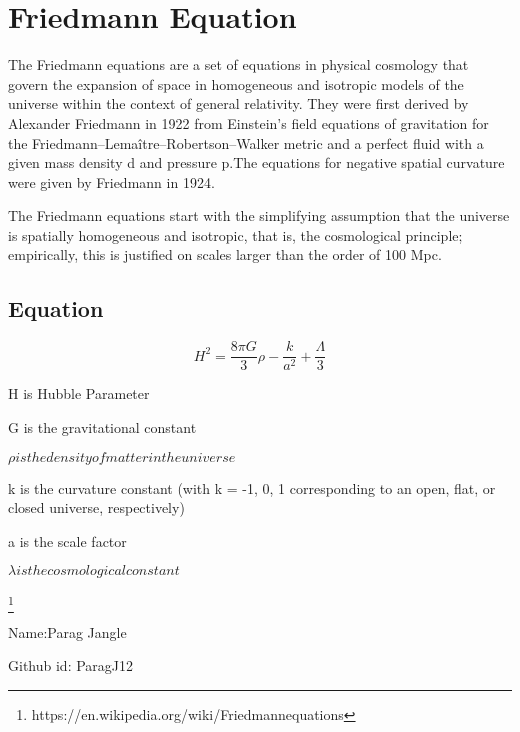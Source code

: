 \section{Friedmann Equation}
     The Friedmann equations are a set of equations in physical cosmology that govern the expansion of space in homogeneous and isotropic models of the universe within the context of general relativity. They were first derived by Alexander Friedmann in 1922 from Einstein's field equations of gravitation for the Friedmann–Lemaître–Robertson–Walker metric and a perfect fluid with a given mass density d and pressure p.The equations for negative spatial curvature were given by Friedmann in 1924.
     
     The Friedmann equations start with the simplifying assumption that the universe is spatially homogeneous and isotropic, that is, the cosmological principle; empirically, this is justified on scales larger than the order of 100 Mpc.
\subsection{Equation}

\begin{equation}
    H^2 = \frac{8\pi G}{3} \rho - \frac{k}{a^2} + \frac{\Lambda}{3}
\end{equation}


H is Hubble Parameter
 
G is the gravitational constant

$
\rho is the density of matter in the universe
$
 
k is the curvature constant (with k = -1, 0, 1 corresponding to an open, flat, 
   or closed universe, respectively)

 
a is the scale factor

$
\lambda is the cosmological constant
$

\footnote{https://en.wikipedia.org/wiki/Friedmannequations}

Name:Parag Jangle

Github id: ParagJ12
